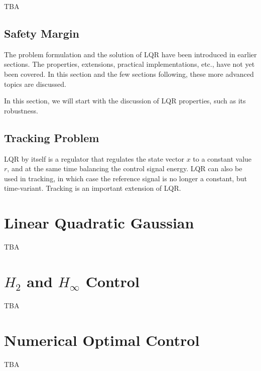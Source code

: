 TBA

\subsection{Safety Margin}

The problem formulation and the solution of LQR have been introduced in earlier sections. The properties, extensions, practical implementations, etc., have not yet been covered. In this section and the few sections following, these more advanced topics are discussed.

In this section, we will start with the discussion of LQR properties, such as its robustness.

\subsection{Tracking Problem}

LQR by itself is a regulator that regulates the state vector $x$ to a constant value $r$, and at the same time balancing the control signal energy. LQR can also be used in tracking, in which case the reference signal is no longer a constant, but time-variant. Tracking is an important extension of LQR.

\section{Linear Quadratic Gaussian}

TBA

\section{$H_2$ and $H_\infty$ Control} 

TBA

\section{Numerical Optimal Control}

TBA

